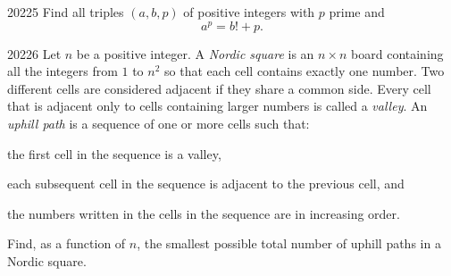 \begin{problem}{2022}{5}
Find all triples $(a, b, p)$ of positive integers with $p$ prime and
\[
    a^p=b!+p.
\]
\end{problem}

\begin{problem}{2022}{6}
Let $n$ be a positive integer. A \emph{Nordic square} is an $n\times n$ board containing all the integers from $1$ to $n^2$ so that each cell contains exactly one number. Two different cells are considered adjacent if they share a common side. Every cell that is adjacent only to cells containing larger numbers is called a \emph{valley}. An \emph{uphill path} is a sequence of one or more cells such that:
\begin{problemclauses}
    \item the first cell in the sequence is a valley,
    \item each subsequent cell in the sequence is adjacent to the previous cell, and
    \item the numbers written in the cells in the sequence are in increasing order.
\end{problemclauses}
Find, as a function of $n$, the smallest possible total number of uphill paths in a Nordic square.
\end{problem}
